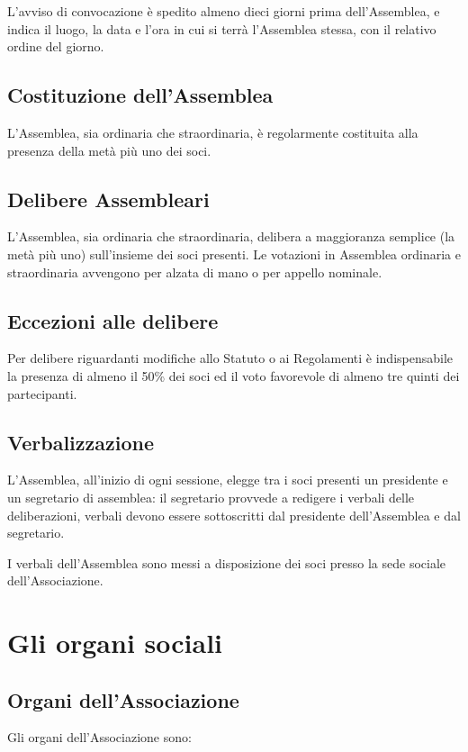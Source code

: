 \documentclass[a4paper,11pt,oneside]{article}
\begin{document}
L'avviso di convocazione è spedito almeno dieci giorni prima dell'Assemblea, e indica il luogo, la data e l'ora in cui si terrà l'Assemblea stessa, con il relativo ordine del giorno.

\subsection{Costituzione dell'Assemblea}
L'Assemblea, sia ordinaria che straordinaria, è regolarmente costituita alla presenza della metà più uno dei soci.

\subsection{Delibere Assembleari}
L'Assemblea, sia ordinaria che straordinaria, delibera a maggioranza semplice (la metà più uno) sull'insieme dei soci presenti. Le votazioni in Assemblea ordinaria e straordinaria avvengono per alzata di mano o per appello nominale.

\subsection{Eccezioni alle delibere}
Per delibere riguardanti modifiche allo Statuto o ai Regolamenti è indispensabile la presenza di almeno il 50\% dei soci ed il voto favorevole di almeno tre quinti dei partecipanti.

\subsection{Verbalizzazione}
L'Assemblea, all'inizio di ogni sessione, elegge tra i soci presenti un presidente e un segretario di assemblea: il segretario provvede a redigere i verbali delle deliberazioni, verbali devono essere sottoscritti dal presidente dell'Assemblea e dal segretario.

I verbali dell'Assemblea sono messi a disposizione dei soci presso la sede sociale dell'Associazione.

\section{Gli organi sociali}

\subsection{Organi dell'Associazione}
Gli organi dell'Associazione sono:
\end{document}
